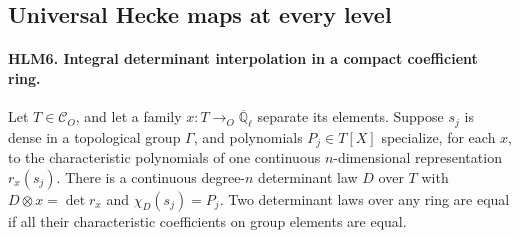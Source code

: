 \documentclass[11pt,a4paper]{article}
\numberwithin{equation}{section}
\theoremstyle{remark}\newtheorem{remark}[theorem]{Remark}
\begin{document}
\subsection{Universal Hecke maps at every level}

\paragraph{HLM6. Integral determinant interpolation in a compact coefficient ring.}
\label{claim:HLM6}
Let \(T\in\mathcal C_O\), and let a family
\(x:T\to_O\overline{\mathbb Q}_\ell\) separate its elements.
Suppose \(s_j\) is dense in a topological group \(\Gamma\),
and polynomials \(P_j\in T[X]\) specialize, for each \(x\),
to the characteristic polynomials of one continuous
\(n\)-dimensional representation \(r_x(s_j)\).
There is a continuous degree-\(n\) determinant law \(D\) over
\(T\) with \(D\otimes x=\det r_x\) and
\(\chi_D(s_j)=P_j\).
Two determinant laws over any ring are equal if all their
characteristic coefficients on group elements are equal.
\end{document}
